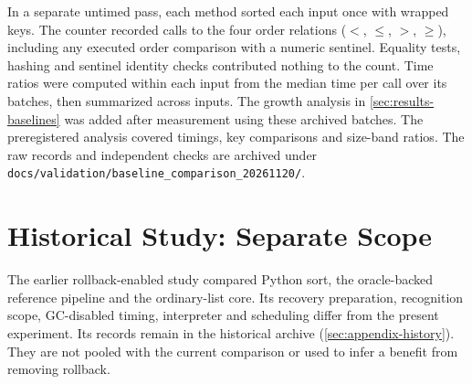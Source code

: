 In a separate untimed pass, each method sorted each input once with wrapped
keys. The counter recorded calls to the four order relations ($<$, $\leq$,
$>$, $\geq$), including any executed order comparison with a numeric
sentinel. Equality tests, hashing and sentinel identity checks contributed
nothing to the count. Time ratios were computed within each input from the
median time per call over its batches, then summarized across inputs. The
growth analysis in \cref{sec:results-baselines} was added after measurement
using these archived batches. The preregistered analysis covered timings,
key comparisons and size-band ratios. The raw records and independent checks
are archived under \nolinkurl{docs/validation/baseline_comparison_20261120/}.

\section{Historical Study: Separate Scope}
\label{sec:method-protocol}
\label{sec:method-case-audit}
\label{sec:method-python-sort}
\label{sec:method-reference-pipeline}
\label{sec:method-paper-implementation}

The earlier rollback-enabled study compared Python sort, the oracle-backed
reference pipeline and the ordinary-list core. Its recovery preparation,
recognition scope, GC-disabled timing, interpreter and scheduling differ
from the present experiment. Its records remain in the historical archive
(\cref{sec:appendix-history}). They are not pooled with the current comparison
or used to infer a benefit from removing rollback.
